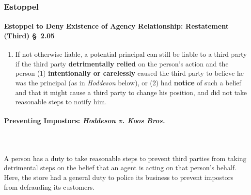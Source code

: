 \subsubsection{Estoppel}

\paragraph{Estoppel to Deny Existence of Agency Relationship: Restatement 
(Third) \S\ 2.05}

\begin{enumerate}
    \item If not otherwise liable, a potential principal can still be liable 
    to a third party if the third party \textbf{detrimentally relied} on the 
    person's action and the person (1) \textbf{intentionally or carelessly} 
    caused the third party to believe he was the principal (as in 
    \emph{Hoddeson} below), or (2) had \textbf{notice} of such a belief and 
    that it might cause a third party to change his position, and did not take 
    reasonable steps to notify him.
\end{enumerate}

\paragraph{Preventing Impostors: \emph{Hoddeson v. Koos Bros.}}
~\\\\\label{par:hodd}
A person has a duty to take reasonable steps to prevent third parties from taking 
detrimental steps on the belief that an agent is acting on that person's 
behalf. Here, the store had a general duty to police its business to prevent 
impostors from defrauding its customers.

